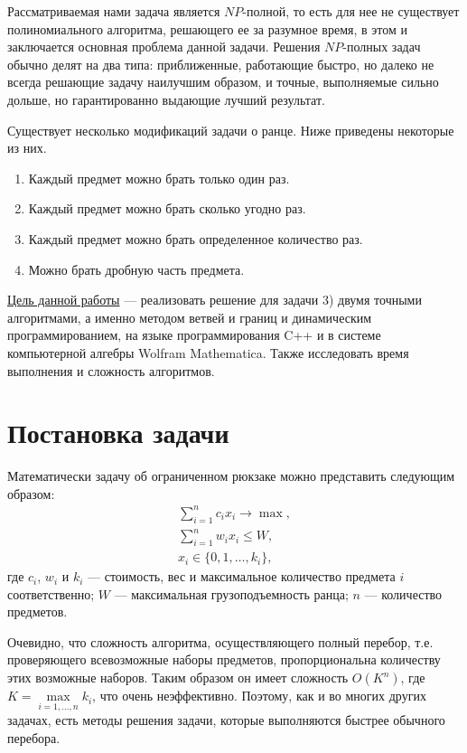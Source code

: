 \documentclass[12pt, a4paper]{article}
\begin{document}
\medskip

Рассматриваемая нами задача является $N\!P$-полной, то есть для нее не существует полиномиального алгоритма, решающего ее за разумное время, в этом и заключается основная проблема данной задачи. Решения $N\!P$-полных задач обычно делят на два типа: приближенные, работающие быстро, но далеко не всегда решающие задачу наилучшим образом, и точные, выполняемые сильно дольше, но гарантированно выдающие лучший результат.

Существует несколько модификаций задачи о ранце. Ниже приведены некоторые из них.
\begin{enumerate}
	\item Каждый предмет можно брать только один раз.
	\item Каждый предмет можно брать сколько угодно раз.
	\item Каждый предмет можно брать определенное количество раз.
	\item Можно брать дробную часть предмета.
\end{enumerate}

\medskip
\underline{Цель данной работы} --- реализовать решение для задачи 3) двумя точными алгоритмами, а именно методом ветвей и границ и динамическим программирова\-нием, на языке программирования C++ и в системе компьютерной алгебры Wolfram Mathematica. Также исследовать время выполнения и сложность алгоритмов.

\section{Постановка задачи}

Математически задачу об ограниченном рюкзаке можно представить следующим образом:
\begin{equation}
	\label{problem}
	\begin{gathered}
		\sum_{i=1}^{n} c_i x_i \rightarrow \max, \\
		\sum_{i=1}^{n} w_i x_i \le W, \\
		x_i \in \{0,1,\dots,k_i\},
	\end{gathered}
\end{equation}
где $c_i$, $w_i$ и $k_i$ --- стоимость, вес и максимальное количество предмета $i$ соответственно; $W$ --- максимальная грузоподъемность ранца; $n$ --- количество предметов.

Очевидно, что сложность алгоритма, осуществляющего полный перебор, т.е. проверяющего всевозможные наборы предметов, пропорциональна количеству этих возможные наборов. Таким образом он имеет сложность $O(K^n)$, где $K = \max\limits_{i=1,\dots,n} k_i$, что очень неэффективно. Поэтому, как и во многих других задачах, есть методы решения задачи, которые выполняются быстрее обычного перебора.
\end{document}
